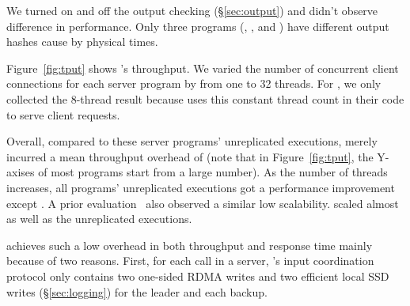 We turned on and off the output checking (\S\ref{sec:output}) and didn't 
observe difference in \xxx performance. Only three programs (\mediatomb, 
\mysql, and \openldap) have different output hashes cause by physical times.

Figure~\ref{fig:tput} shows \xxx's throughput. We varied the number of 
concurrent client connections for each server program by from one to 32 
threads. For \calvin, we only collected the 8-thread result because \calvin 
uses this constant thread count in their code to serve client requests.

Overall, compared to these server programs' unreplicated executions, \xxx 
merely incurred a mean throughput overhead of \tputoverhead (note that in 
Figure~\ref{fig:tput}, the Y-axises of most programs start from a large 
number). As the number of threads increases, all programs' unreplicated 
executions got a performance improvement except \memcached. A prior
evaluation~\cite{rex:eurosys14} also observed a similar \memcached low
scalability. \xxx scaled almost as well as the unreplicated executions.

\xxx achieves such a low overhead in both throughput and response time mainly
because of two reasons. First, for each \recv call in a server, \xxx's input
coordination protocol only contains two one-sided RDMA writes and two efficient 
local SSD writes (\S\ref{sec:logging}) for the leader and each backup.


